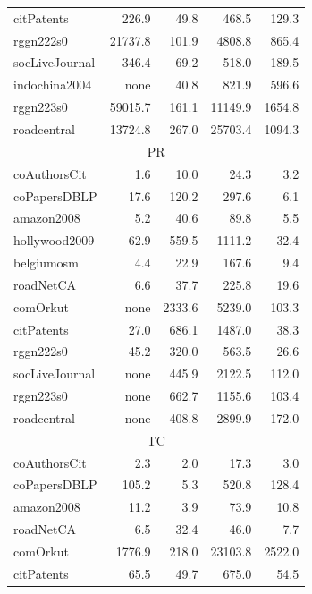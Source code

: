 \begin{table}[tbp]
\begin{center}
\begin{tabular}{|l|r|r|r|r|}
    \rowcolor{black!2 } citPatents&226.9&49.8&468.5&129.3\\
    \rowcolor{black!10} rggn222s0&21737.8&101.9&4808.8&865.4\\
    \rowcolor{black!2 } socLiveJournal&346.4&69.2&518.0&189.5\\
    \rowcolor{black!10} indochina2004& none&40.8&821.9&596.6\\
    \rowcolor{black!2 } rggn223s0&59015.7&161.1&11149.9&1654.8\\
    \rowcolor{black!10} roadcentral&13724.8&267.0&25703.4&1094.3\\
    \hline
    \hline
    \multicolumn{5}{|c|}{PR} \\
    \hline
    \rowcolor{black!10} coAuthorsCit&1.6&10.0&24.3&3.2\\
    \rowcolor{black!2 } coPapersDBLP&17.6&120.2&297.6&6.1\\
    \rowcolor{black!10} amazon2008&5.2&40.6&89.8&5.5\\
    \rowcolor{black!2 } hollywood2009&62.9&559.5&1111.2&32.4\\
    \rowcolor{black!10} belgiumosm&4.4&22.9&167.6&9.4\\
    \rowcolor{black!2 } roadNetCA&6.6&37.7&225.8&19.6\\
    \rowcolor{black!10} comOrkut& none&2333.6&5239.0&103.3\\
    \rowcolor{black!2 } citPatents&27.0&686.1&1487.0&38.3\\
    \rowcolor{black!10} rggn222s0&45.2&320.0&563.5&26.6\\
    \rowcolor{black!2 } socLiveJournal& none&445.9&2122.5&112.0\\
    \rowcolor{black!10} rggn223s0& none&662.7&1155.6&103.4\\
    \rowcolor{black!2 } roadcentral& none&408.8&2899.9&172.0\\
    \hline
    \hline
    \multicolumn{5}{|c|}{TC} \\
    \hline
    \rowcolor{black!10} coAuthorsCit&2.3&2.0&17.3&3.0\\
    \rowcolor{black!2 } coPapersDBLP&105.2&5.3&520.8&128.4\\
    \rowcolor{black!10} amazon2008&11.2&3.9&73.9&10.8\\
    \rowcolor{black!2 } roadNetCA&6.5&32.4&46.0&7.7\\
    \rowcolor{black!10} comOrkut&1776.9&218.0&23103.8&2522.0\\
    \rowcolor{black!2 } citPatents&65.5&49.7&675.0&54.5\\

\end{tabular}
\end{center}
\end{table}
